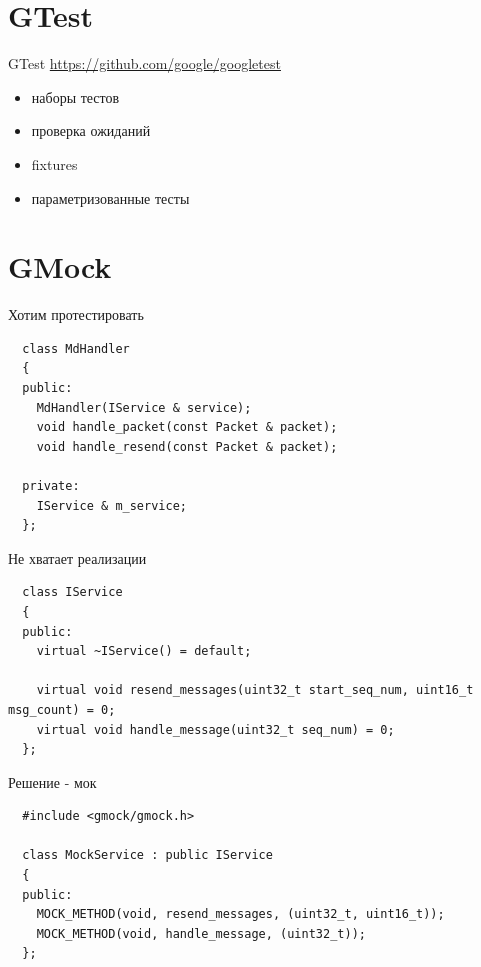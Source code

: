 \documentclass[unknownkeysallowed,xcolor=table]{beamer}
\begin{document}
\section{GTest}

\begin{frame}{GTest}
  \url{https://github.com/google/googletest}

  \vspace{2em}
  \begin{itemize}
    \item наборы тестов
    \item проверка ожиданий
    \item fixtures
    \item параметризованные тесты
  \end{itemize}
\end{frame}

\section{GMock}

\begin{frame}[fragile]{Хотим протестировать}
  \begin{lstlisting}
  class MdHandler
  {
  public:
    MdHandler(IService & service);
    void handle_packet(const Packet & packet);
    void handle_resend(const Packet & packet);

  private:
    IService & m_service;
  };
  \end{lstlisting}
\end{frame}

\begin{frame}[fragile]{Не хватает реализации}
  \begin{lstlisting}
  class IService
  {
  public:
    virtual ~IService() = default;

    virtual void resend_messages(uint32_t start_seq_num, uint16_t msg_count) = 0;
    virtual void handle_message(uint32_t seq_num) = 0;
  };
  \end{lstlisting}
\end{frame}

\begin{frame}[fragile]{Решение - мок}
  \begin{lstlisting}
  #include <gmock/gmock.h>

  class MockService : public IService
  {
  public:
    MOCK_METHOD(void, resend_messages, (uint32_t, uint16_t));
    MOCK_METHOD(void, handle_message, (uint32_t));
  };
  \end{lstlisting}
\end{frame}
\end{document}
